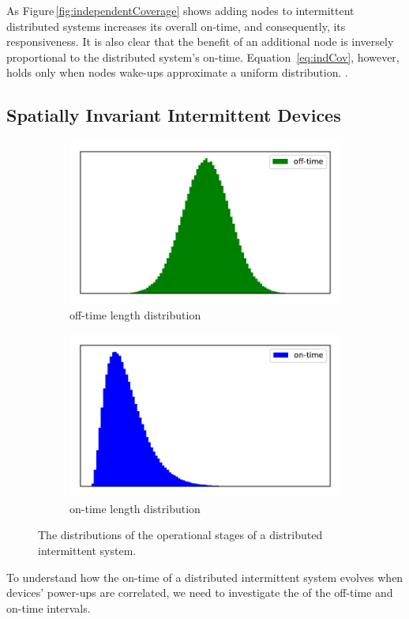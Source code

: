 As Figure\,\ref{fig:independentCoverage} shows adding nodes to intermittent distributed systems increases its overall on-time, and consequently, its responsiveness. It is also clear that the benefit of an additional node is inversely proportional to the distributed system's on-time. Equation~\ref{eq:indCov}, however, holds only when nodes wake-ups approximate a uniform distribution. . 

\subsection{Spatially Invariant Intermittent Devices}
%
\begin{figure}
	\centering
	\begin{subfigure}[t]{0.49\columnwidth}
		\includegraphics[width=\textwidth]{figures/offtime.pdf}
			\caption{off-time length distribution}
		\label{fig:offtime}
	\end{subfigure}
	\begin{subfigure}[t]{0.49\columnwidth}
		\includegraphics[width=\textwidth]{figures/ontime.pdf}
		\caption{on-time length distribution}
		\label{fig:ontime}
	\end{subfigure}
		\caption{The distributions of the operational stages of a distributed intermittent system.}		
\end{figure}
%
To understand how the on-time of a distributed intermittent system evolves when devices' power-ups are correlated, we need to investigate the  of the off-time and on-time intervals.  

